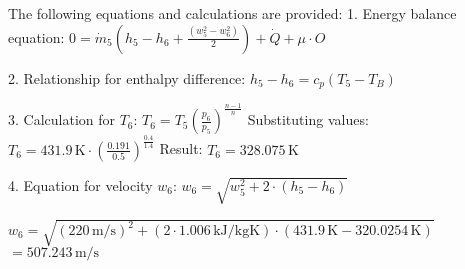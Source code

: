 The following equations and calculations are provided:  
1. Energy balance equation:  
   \( 0 = \dot{m}_5 (h_5 - h_6 + \frac{(w_5^2 - w_6^2)}{2}) + \dot{Q} + \mu \cdot O \)  

2. Relationship for enthalpy difference:  
   \( h_5 - h_6 = c_p (T_5 - T_B) \)  

3. Calculation for \( T_6 \):  
   \( T_6 = T_5 (\frac{p_6}{p_5})^{\frac{n-1}{n}} \)  
   Substituting values:  
   \( T_6 = 431.9 \, \text{K} \cdot (\frac{0.191}{0.5})^{\frac{0.4}{1.4}} \)  
   Result: \( T_6 = 328.075 \, \text{K} \)  

4. Equation for velocity \( w_6 \):  
   \( w_6 = \sqrt{w_5^2 + 2 \cdot (h_5 - h_6)} \)

\( w_6 = \sqrt{(220 \, \text{m/s})^2 + (2 \cdot 1.006 \, \text{kJ/kgK}) \cdot (431.9 \, \text{K} - 320.0254 \, \text{K})} \)  
\( = 507.243 \, \text{m/s} \)
